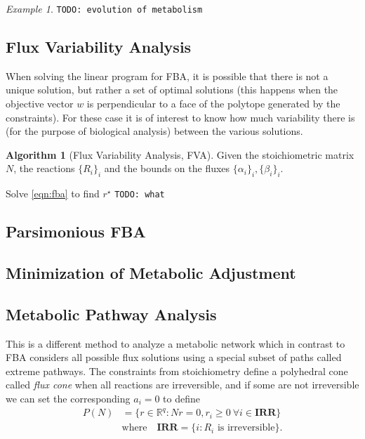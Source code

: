 \documentclass[a4paper]{article}
\newcommand{\todo}[1]{\texttt{TODO: #1}}
\theoremstyle{plain}
\theoremstyle{definition}
\newtheorem{alg}{Algorithm}[section]
\theoremstyle{remark}
\newtheorem*{example}{Example}
\begin{document}
\begin{example}
  \todo{evolution of metabolism}
\end{example}

\subsection{Flux Variability Analysis}

When solving the linear program for FBA, it is possible that there is not a
unique solution, but rather a set of optimal solutions (this happens when the
objective vector $w$ is perpendicular to a face of the polytope generated by
the constraints). For these case it is of interest to know how much
variability there is (for the purpose of biological analysis) between the
various solutions.

\begin{alg}[Flux Variability Analysis, FVA]
  Given the stoichiometric matrix $N$, the reactions $\{R_i\}_i$ and the
  bounds on the fluxes $\{\alpha_i\}_i, \{\beta_i\}_i$.
  \begin{algorithmic}
      \State Solve \eqref{eqn:fba} to find $r^\star$
      \State \todo{what}
    \EndFunction
  \end{algorithmic}
\end{alg}

\subsection{Parsimonious FBA}

\subsection{Minimization of Metabolic Adjustment}

\subsection{Metabolic Pathway Analysis}

This is a different method to analyze a metabolic network which in contrast to
FBA considers all possible flux solutions using a special subset of paths
called extreme pathways. The constraints from stoichiometry define a
polyhedral cone called \emph{flux cone} when all reactions are irreversible,
and if some are not irreversible we can set the corresponding $a_i = 0$ to
define
\begin{align*}
  P(N) &= \{
    r \in \mathbb{R}^q : Nr = 0, r_i \geq 0  ~ \forall i \in \textbf{IRR}
  \} \\
  &\text{where} \quad
    \textbf{IRR} = \{ i : R_i \text{ is irreversible} \}.
\end{align*}
\end{document}
